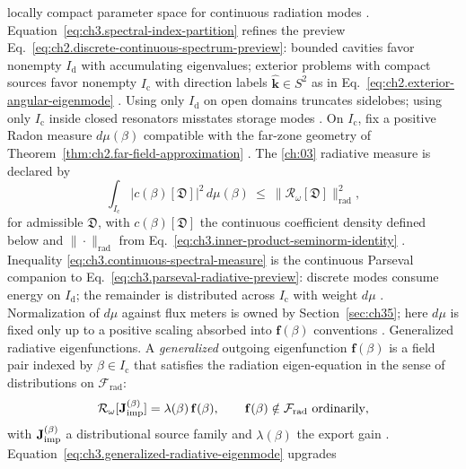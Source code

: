 locally compact parameter space for continuous radiation modes \cite{stratton1941}.
Equation~\eqref{eq:ch3.spectral-index-partition} refines the preview
Eq.~\eqref{eq:ch2.discrete-continuous-spectrum-preview}: bounded cavities favor nonempty
\(I_{\mathrm{d}}\) with accumulating eigenvalues; exterior problems with compact sources favor
nonempty \(I_{\mathrm{c}}\) with direction labels \(\hat{\mathbf{k}}\in S^{2}\) as in
Eq.~\eqref{eq:ch2.exterior-angular-eigenmode} \cite{stratton1941}. Using only
\(I_{\mathrm{d}}\) on open domains truncates sidelobes; using only \(I_{\mathrm{c}}\) inside closed
resonators misstates storage modes \cite{jackson1999}.
On \(I_{\mathrm{c}}\), fix a positive Radon measure \(d\mu(\beta)\) compatible with the far-zone
geometry of Theorem~\ref{thm:ch2.far-field-approximation} \cite{stratton1941}. The
\ref{ch:03} radiative measure is declared by
\begin{equation}
\label{eq:ch3.continuous-spectral-measure}
\int_{I_{\mathrm{c}}}
|c(\beta)[\mathfrak{D}]|^{2}\,d\mu(\beta)
\ \le\
\|\mathcal{R}_\omega[\mathfrak{D}]\|_{\mathrm{rad}}^{2},
\end{equation}
for admissible \(\mathfrak{D}\), with \(c(\beta)[\mathfrak{D}]\) the continuous coefficient density
defined below and \(\|\cdot\|_{\mathrm{rad}}\) from
Eq.~\eqref{eq:ch3.inner-product-seminorm-identity} \cite{stratton1941}. Inequality
\eqref{eq:ch3.continuous-spectral-measure} is the continuous Parseval companion to
Eq.~\eqref{eq:ch3.parseval-radiative-preview}: discrete modes consume energy on \(I_{\mathrm{d}}\);
the remainder is distributed across \(I_{\mathrm{c}}\) with weight \(d\mu\) \cite{stratton1941}.
Normalization of \(d\mu\) against flux meters is owned by Section~\ref{sec:ch35}; here \(d\mu\) is
fixed only up to a positive scaling absorbed into \(\mathbf{f}(\beta)\) conventions
\cite{harrington2001}.
Generalized radiative eigenfunctions. A \emph{generalized} outgoing eigenfunction \(\mathbf{f}(\beta)\) is a field pair indexed by
\(\beta\in I_{\mathrm{c}}\) that satisfies the radiation eigen-equation in the sense of distributions
on \(\mathcal{F}_{\mathrm{rad}}\):
\begin{equation}
\label{eq:ch3.generalized-radiative-eigenmode}
\mathcal{R}_\omega[\Jimp^{(\beta)}]
=
\lambda(\beta)\,\mathbf{f}(\beta),
\qquad
\mathbf{f}(\beta)\notin\mathcal{F}_{\mathrm{rad}}\ \text{ordinarily},
\end{equation}
with \(\mathbf{J}_{\mathrm{imp}}^{(\beta)}\) a distributional source family and \(\lambda(\beta)\) the export gain
\cite{stratton1941}. Equation~\eqref{eq:ch3.generalized-radiative-eigenmode} upgrades
